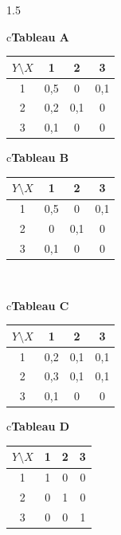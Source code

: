 \documentclass[12pt]{article}
\begin{document}
\begin{spacing}{1.5}
 \begin{center}
\begin{tabular}{c}\textbf{Tableau A}\\[2pt]
\begin{tabular}{|c|c|c|c|}
 \hline 
 $Y\setminus X $& 1 & 2 & 3 \\ 
 \hline 
 1 & 0,5 & 0 & 0,1 \\ 
 \hline 
 2 & 0,2 & 0,1 & 0 \\ 
 \hline 
 3 & 0,1 & 0 & 0 \\ 
 \hline 
 \end{tabular}
\end{tabular}\qquad
\begin{tabular}{c}\textbf{Tableau B}\\[2pt]
\begin{tabular}{|c|c|c|c|}
 \hline 
 $Y\setminus X $& 1 & 2 & 3 \\ 
 \hline 
 1 & 0,5 & 0 & 0,1 \\ 
 \hline 
 2 & 0 & 0,1 & 0 \\ 
 \hline 
 3 & 0,1 & 0 & 0 \\ 
 \hline 
 \end{tabular}
\end{tabular}\\[10pt]
\begin{tabular}{c}\textbf{Tableau C}\\[2pt]
\begin{tabular}{|c|c|c|c|}
 \hline 
 $Y\setminus X $& 1 & 2 & 3 \\ 
 \hline 
 1 & 0,2 & 0,1 & 0,1 \\ 
 \hline 
 2 & 0,3 & 0,1 & 0,1 \\ 
 \hline 
 3 & 0,1 & 0 & 0 \\ 
 \hline 
 \end{tabular}
\end{tabular}\qquad
\begin{tabular}{c}\textbf{Tableau D}\\[2pt]
\begin{tabular}{|c|c|c|c|}
 \hline 
 $Y\setminus X $& 1 & 2 & 3 \\ 
 \hline 
 1 & 1 & 0 & 0 \\ 
 \hline 
 2 & 0 & 1 & 0 \\ 
 \hline 
 3 & 0 & 0 & 1 \\ 
 \hline 
 \end{tabular}
\end{tabular}\\[10pt]
\end{center}


\end{spacing}
\end{document}
